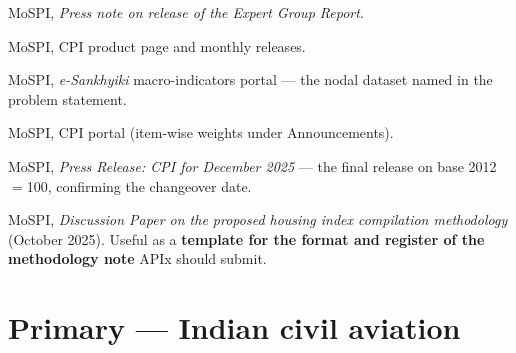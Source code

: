 \begin{enumerate}[label={[\arabic*]}]
\item MoSPI, \emph{Press note on release of the Expert Group Report}.\\

\item MoSPI, CPI product page and monthly releases.\\

\item MoSPI, \emph{e-Sankhyiki} macro-indicators portal --- the nodal dataset named in the
problem statement.\\

\item MoSPI, CPI portal (item-wise weights under Announcements).

\item MoSPI, \emph{Press Release: CPI for December 2025} --- the final release on base
2012$=$100, confirming the changeover date.\\

\item MoSPI, \emph{Discussion Paper on the proposed housing index compilation methodology}
(October 2025). Useful as a \textbf{template for the format and register of the methodology
note} APIx should submit.
\end{enumerate}

\section{Primary --- Indian civil aviation}

